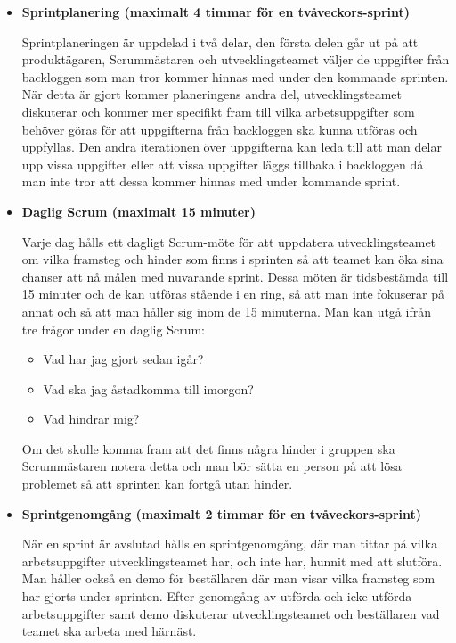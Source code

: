 \begin{itemize}
	\item \textbf{Sprintplanering (maximalt 4 timmar för en tvåveckors-sprint)}
	
	Sprintplaneringen är uppdelad i två delar, den första delen går ut på att produktägaren, Scrummästaren och utvecklingsteamet väljer de uppgifter från backloggen som man tror kommer hinnas med under den kommande sprinten. När detta är gjort kommer planeringens andra del, utvecklingsteamet diskuterar och kommer mer specifikt fram till vilka arbetsuppgifter som behöver göras för att uppgifterna från backloggen ska kunna utföras och uppfyllas. Den andra iterationen över uppgifterna kan leda till att man delar upp vissa uppgifter eller att vissa uppgifter läggs tillbaka i backloggen då man inte tror att dessa kommer hinnas med under kommande sprint.
	
	\item \textbf{Daglig Scrum (maximalt 15 minuter)}
	
	Varje dag hålls ett dagligt Scrum-möte för att uppdatera utvecklingsteamet om vilka framsteg och hinder som finns i sprinten så att teamet kan öka sina chanser att nå målen med nuvarande sprint. Dessa möten är tidsbestämda till 15 minuter och de kan utföras stående i en ring, så att man inte fokuserar på annat och så att man håller sig inom de 15 minuterna. Man kan utgå ifrån tre frågor under en daglig Scrum:
	
	\begin{itemize}
		\item Vad har jag gjort sedan igår?
		\item Vad ska jag åstadkomma till imorgon?
		\item Vad hindrar mig?
	\end{itemize}
	
	Om det skulle komma fram att det finns några hinder i gruppen ska Scrummästaren notera detta och man bör sätta en person på att lösa problemet så att sprinten kan fortgå utan hinder.
	
	\item \textbf{Sprintgenomgång (maximalt 2 timmar för en tvåveckors-sprint)}
	
	När en sprint är avslutad hålls en sprintgenomgång, där man tittar på vilka arbetsuppgifter utvecklingsteamet har, och inte har, hunnit med att slutföra. Man håller också en demo för beställaren där man visar vilka framsteg som har gjorts under sprinten. Efter genomgång av utförda och icke utförda arbetsuppgifter samt demo diskuterar utvecklingsteamet och beställaren vad teamet ska arbeta med härnäst.
	 

\end{itemize}
